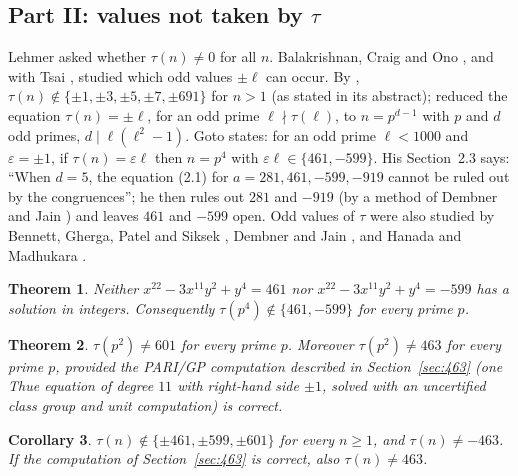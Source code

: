 \documentclass[11pt]{amsart}
\newtheorem{theorem}{Theorem}[section]
\newtheorem{corollary}[theorem]{Corollary}
\theoremstyle{definition}
\numberwithin{equation}{section}
\begin{document}
\subsection{Part II: values not taken by \texorpdfstring{$\tau$}{tau}}
Lehmer asked whether $\tau(n)\ne0$ for all $n$. Balakrishnan, Craig and Ono \cite{BCO}, and with Tsai \cite{BCOT}, studied which odd values $\pm\ell$ can occur. By \cite{BCO}, $\tau(n)\notin\{\pm1,\pm3,\pm5,\pm7,\pm691\}$ for $n>1$ (as stated in its abstract); \cite{BCOT} reduced the equation $\tau(n)=\pm\ell$, for an odd prime $\ell\nmid\tau(\ell)$, to $n=p^{d-1}$ with $p$ and $d$ odd primes, $d\mid\ell(\ell^2-1)$. Goto \cite[Theorem~0.3]{Goto} states: for an odd prime $\ell<1000$ and $\varepsilon=\pm1$, if $\tau(n)=\varepsilon\ell$ then $n=p^4$ with $\varepsilon\ell\in\{461,-599\}$. His Section~2.3 says: ``When $d=5$, the equation (2.1) for $a=281,461,-599,-919$ cannot be ruled out by the congruences''; he then rules out $281$ and $-919$ (by a method of Dembner and Jain \cite{DJ}) and leaves $461$ and $-599$ open. Odd values of $\tau$ were also studied by Bennett, Gherga, Patel and Siksek \cite{BGPS}, Dembner and Jain \cite{DJ}, and Hanada and Madhukara \cite{HM}.

\begin{theorem}\label{thm:p4}
Neither $x^{22}-3x^{11}y^2+y^4=461$ nor $x^{22}-3x^{11}y^2+y^4=-599$ has a solution in integers. Consequently $\tau(p^4)\notin\{461,-599\}$ for every prime $p$.
\end{theorem}

\begin{theorem}\label{thm:p2}
$\tau(p^2)\ne601$ for every prime $p$. Moreover $\tau(p^2)\ne463$ for every prime $p$, \emph{provided} the PARI/GP computation described in Section~\ref{sec:463} (one Thue equation of degree $11$ with right-hand side $\pm1$, solved with an uncertified class group and unit computation) is correct.
\end{theorem}

\begin{corollary}\label{cor:values}
$\tau(n)\notin\{\pm461,\pm599,\pm601\}$ for every $n\ge1$, and $\tau(n)\ne-463$. If the computation of Section~\ref{sec:463} is correct, also $\tau(n)\ne463$.
\end{corollary}
\end{document}
